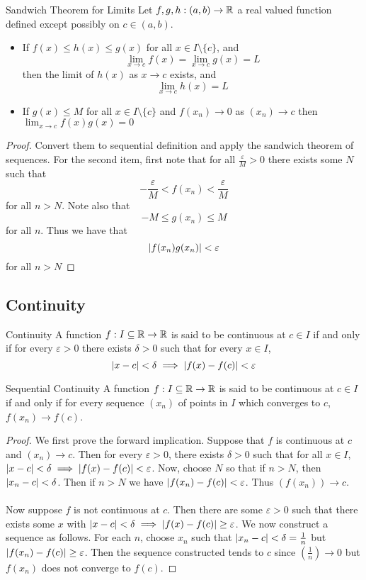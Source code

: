 \documentclass[a4paper]{article}
\begin{document}
\begin{thm}{Sandwich Theorem for Limits}{} Let $f,g,h:(a,b)\to\mathbb{R}$ a real valued function defined except possibly on $c\in(a,b)$. 
\begin{itemize}
\item If $f(x)\leq h(x)\leq g(x)$ for all $x\in I\setminus\{c\}$, and $$\lim_{x\to c}f(x)=\lim_{x\to c}g(x)=L$$ then the limit of $h(x)$ as $x\to c$ exists, and $$\lim_{x\to c}h(x)=L$$
\item If $g(x)\leq M$ for all $x\in I\setminus\{c\}$ and $f(x_n)\to0$ as $(x_n)\to c$ then $\lim_{x\to c}f(x)g(x)=0$
\end{itemize} \tcbline
\begin{proof} Convert them to sequential definition and apply the sandwich theorem of sequences. For the second item, first note that for all $\frac{\varepsilon}{M}>0$ there exists some $N$ such that $$-\frac{\varepsilon}{M}<f(x_n)<\frac{\varepsilon}{M}$$ for all $n>N$. Note also that $$-M\leq g(x_n)\leq M$$ for all $n$. Thus we have that $$\abs{f(x_n)g(x_n)}<\varepsilon$$ for all $n>N$
\end{proof}
\end{thm}

\subsection{Continuity}
\begin{defn}{Continuity}{} A function $f:I\subseteq\mathbb{R}\to\mathbb{R}$ is said to be continuous at $c\in I$ if and only if for every $\varepsilon>0$ there exists $\delta>0$ such that for every $x\in I$, $$\abs{x-c}<\delta\implies\abs{f(x)-f(c)}<\varepsilon$$
\end{defn}

\begin{thm}{Sequential Continuity}{} A function $f:I\subseteq\mathbb{R}\to\mathbb{R}$ is said to be continuous at $c\in I$ if and only if for every sequence $(x_n)$ of points in $I$ which converges to $c$, $f(x_n)\to f(c)$. \tcbline
\begin{proof} We first prove the forward implication. Suppose that $f$ is continuous at $c$ and $(x_n)\to c$. Then for every $\varepsilon>0$, there exists $\delta>0$ such that for all $x\in I$, $\abs{x-c}<\delta\implies\abs{f(x)-f(c)}<\varepsilon$. Now, choose $N$ so that if $n>N$, then $\abs{x_n-c}<\delta$. Then if $n>N$ we have $\abs{f(x_n)-f(c)}<\varepsilon$. Thus $\left(f(x_n)\right)\to c$. \\~\\
Now suppose $f$ is not continuous at $c$. Then there are some $\varepsilon>0$ such that there exists some $x$ with $\abs{x-c}<\delta\implies\abs{f(x)-f(c)}\geq\varepsilon$. We now construct a sequence as follows. For each $n$, choose $x_n$ such that $\abs{x_n-c}<\delta=\frac{1}{n}$ but $\abs{f(x_n)-f(c)}\geq\varepsilon$. Then the sequence constructed tends to $c$ since $\left(\frac{1}{n}\right)\to0$ but $f(x_n)$ does not converge to $f(c)$. 
\end{proof}
\end{thm}
\end{document}
